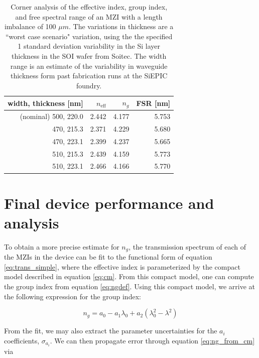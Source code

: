 \documentclass[journal]{IEEEtran}
\begin{document}
\begin{table}
\centering
\begin{tabular}{ r | r | r | r }
  \hline
  width, thickness [nm] & $n_{\text{eff}}$ & $n_g$ & FSR [nm] \\
  \hline
  (nominal) 500, 220.0  & 2.442            & 4.177 & 5.753  \\
  470, 215.3            & 2.371            & 4.229 & 5.680  \\
  470, 223.1            & 2.399            & 4.237 & 5.665  \\
  510, 215.3            & 2.439            & 4.159 & 5.773  \\
  510, 223.1            & 2.466            & 4.166 & 5.770  \\
\end{tabular}
\caption{Corner analysis of the effective index, group index, and free spectral range of an MZI with a length imbalance of 100 $\mu m$. The variations in thickness are a ``worst case scenario" variation, using the the specified 1 standard deviation variability in the Si layer thickness in the SOI wafer from Soitec. The width range is an estimate of the variability in waveguide thickness form past fabrication runs at the SiEPIC foundry.}
\label{tab:corner}
\end{table}



\section{Final device performance and analysis}


To obtain a more precise estimate for $n_g$, the transmission spectrum of each of the MZIs in the device can be fit to the functional form of equation \ref{eq:trans_simple}, where the effective index is parameterized by the compact model described in equation \ref{eq:cm}. From this compact model, one can compute the group index from equation \ref{eq:ngdef}. Using this compact model, we arrive at the following expression for the group index:

\begin{equation}
n_g = a_0 - a_1 \lambda_0 + a_2(\lambda_0^2 - \lambda^2)
\label{eq:ng_from_cm}
\end{equation}

From the fit, we may also extract the parameter uncertainties for the $a_i$ coefficients, $\sigma_{a_i}$. We can then propagate error through equation \ref{eq:ng_from_cm} via
\end{document}
